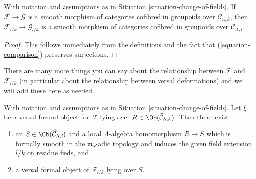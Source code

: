\begin{lemma}
\label{lemma-change-of-fields-smooth}
With notation and assumptions as in Situation \ref{situation-change-of-fields}.
If $\mathcal{F} \to \mathcal{G}$ is a smooth morphism of categories cofibred
in groupoids over $\mathcal{C}_{\Lambda, k}$, then
$\mathcal{F}_{l/k} \to \mathcal{G}_{l/k}$ is a smooth morphism of categories
cofibred in groupoids over $\mathcal{C}_{\Lambda, l}$.
\end{lemma}

\begin{proof}
This follows immediately from the definitions and the fact that
(\ref{equation-comparison}) preserves surjections.
\end{proof}

\noindent
There are many more things you can say about the relationship between
$\mathcal{F}$ and $\mathcal{F}_{l/k}$ (in particular about the relationship
between versal deformations) and we will add these here as needed.

\begin{lemma}
\label{lemma-change-of-field-versal-ring}
With notation and assumptions as in Situation \ref{situation-change-of-fields}.
Let $\xi$ be a versal formal object for $\mathcal{F}$ lying over
$R \in \Ob(\widehat{\mathcal{C}}_{\Lambda, k})$. Then there exist
\begin{enumerate}
\item an $S \in \Ob(\widehat{\mathcal{C}}_{\Lambda, l})$
and a local $\Lambda$-algebra homomorphism $R \to S$ which is
formally smooth in the $\mathfrak m_S$-adic topology and induces
the given field extension $l/k$ on residue fieds, and
\item a versal formal object of $\mathcal{F}_{l/k}$ lying over $S$.
\end{enumerate}
\end{lemma}

